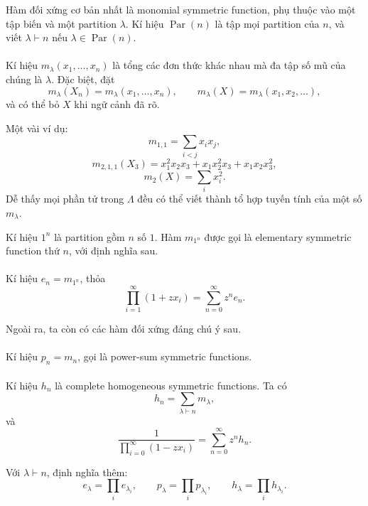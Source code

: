 \documentclass[11pt]{article}
\begin{document}
Hàm đối xứng cơ bản nhất là monomial symmetric function, phụ thuộc vào một tập
biến và một partition \(\lambda\). Kí hiệu \(\operatorname{Par}(n)\) là tập
mọi partition của \(n\), và viết \(\lambda\vdash n\) nếu
\(\lambda\in\operatorname{Par}(n)\).

\paragraph{}
Kí hiệu \(m_\lambda(x_1,\ldots,x_n)\) là tổng các đơn thức khác nhau mà đa tập
số mũ của chúng là \(\lambda\). Đặc biệt, đặt
\[
  m_\lambda(X_n)=m_\lambda(x_1,\ldots,x_n),\qquad
  m_\lambda(X)=m_\lambda(x_1,x_2,\ldots),
\]
và có thể bỏ \(X\) khi ngữ cảnh đã rõ.

Một vài ví dụ:
\[
  m_{1,1}=\sum_{i<j}x_ix_j,
\]
\[
  m_{2,1,1}(X_3)=x_1^2x_2x_3+x_1x_2^2x_3+x_1x_2x_3^2,
\]
\[
  m_2(X)=\sum_i x_i^2.
\]
Dễ thấy mọi phần tử trong \(\Lambda\) đều có thể viết thành tổ hợp tuyến tính
của một số \(m_\lambda\).

Kí hiệu \(1^n\) là partition gồm \(n\) số \(1\). Hàm \(m_{1^n}\) được gọi là
elementary symmetric function thứ \(n\), với định nghĩa sau.

\paragraph{}
Kí hiệu \(e_n=m_{1^n}\), thỏa
\[
  \prod_{i=1}^{\infty}(1+zx_i)=\sum_{n=0}^{\infty}z^ne_n.
\]

Ngoài ra, ta còn có các hàm đối xứng đáng chú ý sau.

\paragraph{}
Kí hiệu \(p_n=m_n\), gọi là power-sum symmetric functions.

\paragraph{}
Kí hiệu \(h_n\) là complete homogeneous symmetric functions. Ta có
\[
  h_n=\sum_{\lambda\vdash n}m_\lambda,
\]
và
\[
  \frac{1}{\prod_{i=0}^{\infty}(1-zx_i)}
  =
  \sum_{n=0}^{\infty}z^nh_n.
\]

Với \(\lambda\vdash n\), định nghĩa thêm:
\[
  e_\lambda=\prod_i e_{\lambda_i},\qquad
  p_\lambda=\prod_i p_{\lambda_i},\qquad
  h_\lambda=\prod_i h_{\lambda_i}.
\]
\end{document}
